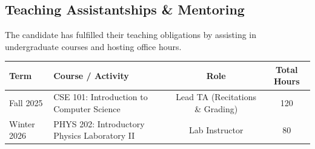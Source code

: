 \subsection{Teaching Assistantships \& Mentoring}
The candidate has fulfilled their teaching obligations by assisting in undergraduate courses and hosting office hours.

\medskip
\begin{tabularx}{\textwidth}{l X c c}
  \toprule
  \textbf{Term} & \textbf{Course / Activity} & \textbf{Role} & \textbf{Total Hours} \\
  \midrule
  Fall 2025 & CSE 101: Introduction to Computer Science & Lead TA (Recitations \& Grading) & 120 \\
  Winter 2026 & PHYS 202: Introductory Physics Laboratory II & Lab Instructor & 80 \\
  \bottomrule
\end{tabularx}
\medskip
